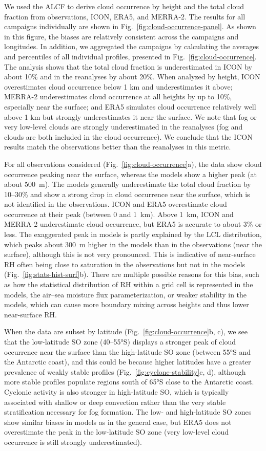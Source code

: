 \documentclass[draft]{agujournal2019}
\begin{document}
We used the ALCF to derive cloud occurrence by height and the total cloud fraction from observations, ICON, ERA5, and MERRA-2. The results for all campaigns individually are shown in Fig.~\ref{fig:cloud-occurrence-panel}. As shown in this figure, the biases are relatively consistent across the campaigns and longitudes. In addition, we aggregated the campaigns by calculating the averages and percentiles of all individual profiles, presented in Fig.~\ref{fig:cloud-occurrence}. The analysis shows that the total cloud fraction is underestimated in ICON by about 10\% and in the reanalyses by about 20\%. When analyzed by height, ICON overestimates cloud occurrence below 1 km and underestimates it above; MERRA-2 underestimates cloud occurrence at all heights by up to 10\%, especially near the surface; and ERA5 simulates cloud occurrence relatively well above 1 km but strongly underestimates it near the surface. We note that fog or very low-level clouds are strongly underestimated in the reanalyses (fog and clouds are both included in the cloud occurrence). We conclude that the ICON results match the observations better than the reanalyses in this metric.

For all observations considered (Fig.~\ref{fig:cloud-occurrence}a), the data show cloud occurrence peaking near the surface, whereas the models show a higher peak (at about 500~m). The models generally underestimate the total cloud fraction by 10–30\% and show a strong drop in cloud occurrence near the surface, which is not identified in the observations. ICON and ERA5 overestimate cloud occurrence at their peak (between 0 and 1~km). Above 1~km, ICON and MERRA-2 underestimate cloud occurrence, but ERA5 is accurate to about 3\% or less. The exaggerated peak in models is partly explained by the LCL distribution, which peaks about 300~m higher in the models than in the observations (near the surface), although this is not very pronounced. This is indicative of near-surface RH often being close to saturation in the observations but not in the models (Fig.~\ref{fig:stats-hist-surf}b). There are multiple possible reasons for this bias, such as how the statistical distribution of RH within a grid cell is represented in the models, the air–sea moisture flux parameterization, or weaker stability in the models, which can cause more boundary mixing across heights and thus lower near-surface RH.

When the data are subset by latitude (Fig.~\ref{fig:cloud-occurrence}b, c), we see that the low-latitude SO zone (40–55°S) displays a stronger peak of cloud occurrence near the surface than the high-latitude SO zone (between 55°S and the Antarctic coast), and this could be because higher latitudes have a greater prevalence of weakly stable profiles (Fig.~\ref{fig:cyclone-stability}c, d), although more stable profiles populate regions south of 65°S close to the Antarctic coast. Cyclonic activity is also stronger in high-latitude SO, which is typically associated with shallow or deep convection rather than the very stable stratification necessary for fog formation. The low- and high-latitude SO zones show similar biases in models as in the general case, but ERA5 does not overestimate the peak in the low-latitude SO zone (very low-level cloud occurrence is still strongly underestimated).
\end{document}
